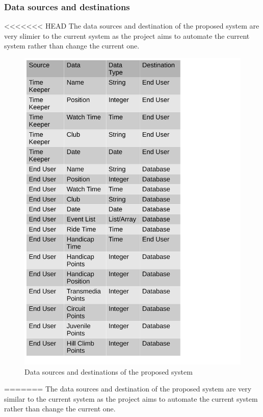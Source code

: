 \subsubsection{Data sources and destinations}
<<<<<<< HEAD
The data sources and destination of the proposed system are very slimier to the current system as the project aims to automate the current system rather than change the current one.

\begin{figure}[H]
	\includegraphics[width=\textwidth]{./DataSourcesPS.pdf}
	 \caption{Data sources and destinations of the proposed system}
\end{figure}
=======
The data sources and destination of the proposed system are very similar to the current system as the project aims to automate the current system rather than change the current one.

